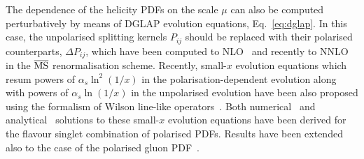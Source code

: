The dependence of the helicity PDFs on the 
scale $\mu$ can also be computed perturbatively by means of DGLAP evolution 
equations, Eq.~\eqref{eq:dglap}.
%
In this case, the unpolarised splitting kernels $P_{ij}$ should be replaced with their
polarised counterparts, $\Delta P_{ij}$, which have been computed to 
NLO~\cite{Mertig:1995ny,Vogelsang:1995vh,Vogelsang:1996im}
and recently to NNLO~\cite{Moch:2014sna} in the $\overline{\rm MS}$ 
renormalisation scheme.
%
Recently,
small-$x$ evolution equations which resum powers of $\alpha_s\ln^2(1/x)$
in the polarisation-dependent evolution along with powers of $\alpha_s\ln(1/x)$
in the unpolarised evolution have been also proposed using the formalism
of Wilson line-like operators~\cite{Kovchegov:2015pbl}.
%
Both numerical~\cite{Kovchegov:2016weo}
and analytical~\cite{Kovchegov:2016zex,Kovchegov:2017jxc}
solutions to these small-$x$ evolution equations have been derived
for the flavour singlet combination of polarised PDFs.
%
Results have been extended also to the case of the polarised gluon 
PDF~\cite{Kovchegov:2017lsr}.
